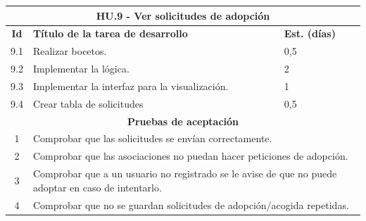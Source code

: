 \begin{table}[H]
	\centering
\begin{tabular}{|c|p{9.5cm}|p{1cm}|}
	\hline
	\multicolumn{3}{|c|}{\textbf{HU.9 - Ver solicitudes de adopción}} \\
	\hline
	\textbf{Id} & \textbf{Título de la tarea de desarrollo} & \textbf{Est. (días)} \\
	\hline
	9.1 & Realizar bocetos. & 0,5 \\ \hline
	9.2 &  Implementar la lógica. & 2 \\ \hline
	9.3 &  Implementar la interfaz para la visualización. & 1 \\ \hline
	9.4 &  Crear tabla de solicitudes & 0,5 \\ \hline
	\multicolumn{3}{|c|}{\textbf{Pruebas de aceptación}} \\ \hline
	1 & \multicolumn{2}{|p{10cm}|}{Comprobar que las solicitudes se envían correctamente.} \\ \hline
	2 & \multicolumn{2}{|p{10cm}|}{Comprobar que las asociaciones no puedan hacer peticiones de adopción.} \\ \hline
	3 & \multicolumn{2}{|p{10cm}|}{Comprobar que a un usuario no registrado se le avise de que no puede adoptar en caso de intentarlo.} \\ \hline
	4 & \multicolumn{2}{|p{10cm}|}{Comprobar que no se guardan solicitudes de adopción/acogida repetidas.} \\ \hline
	
	
\end{tabular}
\end{table}


